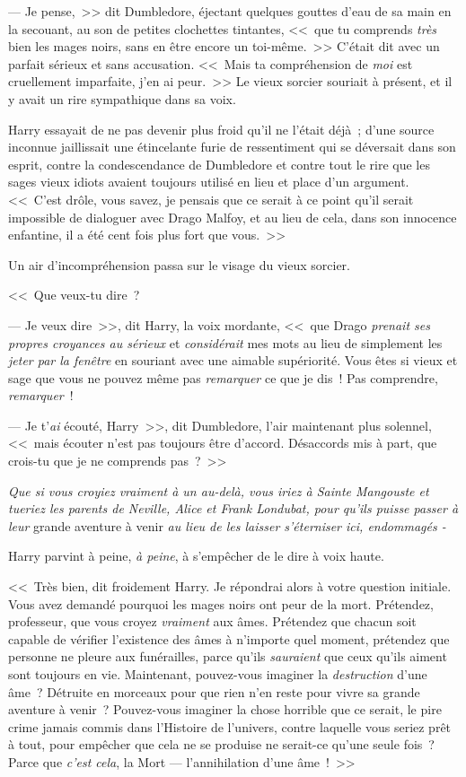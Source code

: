 --- Je pense,~>> dit Dumbledore, éjectant quelques gouttes d'eau de sa main en la secouant, au son de petites clochettes tintantes, <<~que tu comprends \emph{très} bien les mages noirs, sans en être encore un toi-même.~>> C'était dit avec un parfait sérieux et sans accusation. <<~Mais ta compréhension de \emph{moi} est cruellement imparfaite, j'en ai peur.~>> Le vieux sorcier souriait à présent, et il y avait un rire sympathique dans sa voix.

Harry essayait de ne pas devenir plus froid qu'il ne l'était déjà~; d'une source inconnue jaillissait une étincelante furie de ressentiment qui se déversait dans son esprit, contre la condescendance de Dumbledore et contre tout le rire que les sages vieux idiots avaient toujours utilisé en lieu et place d'un argument. <<~C'est drôle, vous savez, je pensais que ce serait à ce point qu'il serait impossible de dialoguer avec Drago Malfoy, et au lieu de cela, dans son innocence enfantine, il a été cent fois plus fort que vous.~>>

Un air d'incompréhension passa sur le visage du vieux sorcier.

<<~Que veux-tu dire~?

--- Je veux dire~>>, dit Harry, la voix mordante, <<~que Drago \emph{prenait ses propres croyances au sérieux} et \emph{considérait} mes mots au lieu de simplement les \emph{jeter par la fenêtre} en souriant avec une aimable supériorité. Vous êtes si vieux et sage que vous ne pouvez même pas \emph{remarquer} ce que je dis~! Pas comprendre, \emph{remarquer}~!

--- Je t'\emph{ai} écouté, Harry~>>, dit Dumbledore, l'air maintenant plus solennel, <<~mais écouter n'est pas toujours être d'accord. Désaccords mis à part, que crois-tu que je ne comprends pas~?~>>

\emph{Que si vous croyiez vraiment à un au-delà, vous iriez à Sainte Mangouste et tueriez les parents de Neville, Alice et Frank Londubat, pour qu'ils puisse passer à leur} grande aventure à venir \emph{au lieu de les laisser s'éterniser ici, endommagés -}

Harry parvint à peine, \emph{à peine}, à s'empêcher de le dire à voix haute.

<<~Très bien, dit froidement Harry. Je répondrai alors à votre question initiale. Vous avez demandé pourquoi les mages noirs ont peur de la mort. Prétendez, professeur, que vous croyez \emph{vraiment} aux âmes. Prétendez que chacun soit capable de vérifier l'existence des âmes à n'importe quel moment, prétendez que personne ne pleure aux funérailles, parce qu'ils \emph{sauraient} que ceux qu'ils aiment sont toujours en vie. Maintenant, pouvez-vous imaginer la \emph{destruction} d'une âme~? Détruite en morceaux pour que rien n'en reste pour vivre sa grande aventure à venir~? Pouvez-vous imaginer la chose horrible que ce serait, le pire crime jamais commis dans l'Histoire de l'univers, contre laquelle vous seriez prêt à tout, pour empêcher que cela ne se produise ne serait-ce qu'une seule fois~? Parce que \emph{c'est cela}, la Mort — l'annihilation d'une âme~!~>>

